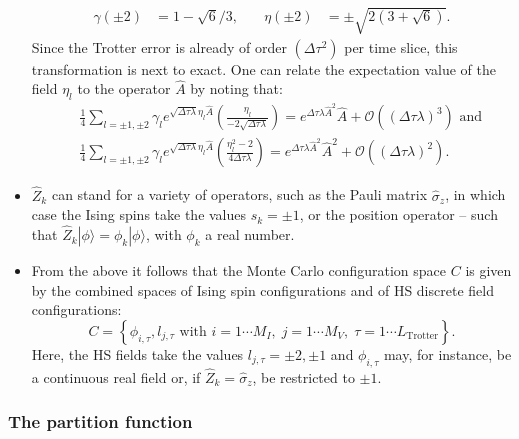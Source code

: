 \begin{itemize}
\begin{equation}
\begin{aligned}
\gamma(\pm 2) &= 1 - \sqrt{6}/3, \quad & \eta(\pm 2 ) &= \pm \sqrt{2 \left(3 + \sqrt{6} \right)}.
\end{aligned}
\end{equation}
Since the Trotter error is already of order $(\Delta \tau ^2) $ per time slice, this transformation is next to exact.
One can relate the expectation value of the field $\eta_l$ to the operator $\hat{A}$  by noting that:
\begin{eqnarray} 
    & &  \frac{1}{4} \sum_{l = \pm 1, \pm 2} \gamma_l e^{\sqrt{ \Delta \tau \lambda} \eta_l \hat{A}} \left( \frac{\eta_l}{-2 \sqrt{ \Delta \tau \lambda}  } \right)    =   e^{ \Delta \tau \lambda  \hat{A}^2}  \hat{A}  +   \mathcal{O}  \left( (\Delta \tau \lambda)^3\right)   \text{  and } \nonumber \\  
     & &    \frac{1}{4} \sum_{l = \pm 1, \pm 2} \gamma_l e^{\sqrt{ \Delta \tau \lambda} \eta_l \hat{A}} \left( \frac{\eta_l^2 - 2}{4 \Delta \tau \lambda  } \right)    =   e^{ \Delta \tau \lambda  \hat{A}^2}  \hat{A}^2  +   \mathcal{O}  \left( (\Delta \tau \lambda)^2\right).
\end{eqnarray}
\item $\hat{Z}_k$ can stand for a variety of operators, such as the Pauli matrix $\hat{\sigma}_{z}$, in which case the Ising spins take the values $s_{k} = \pm 1$, or the position operator -- such that $ \hat{Z}_k | \phi\rangle = \phi_k  |\phi\rangle $, with $\phi_k$ a real number.  

\item From the above it follows that the  Monte Carlo configuration space $C$  
is given by the combined spaces of Ising spin configurations  and of HS discrete field configurations:
\begin{equation}
	C = \left\{   \phi_{i,\tau} ,  l_{j,\tau}  \text{ with }  i=1\cdots M_I,\;  j = 1\cdots M_V,\; \tau=1\cdots L_{\mathrm{Trotter}}  \right\}.
\end{equation}
Here, the HS fields take the values $l_{j,\tau} = \pm 2, \pm 1 $ and  $\phi_{i,\tau}$ may, for instance, be a continuous real field or, if $\hat{Z}_k = \hat{\sigma}_{z}$, be restricted to $\pm 1$.
\end{itemize}

\subsubsection{The partition function}\label{sec:part}

